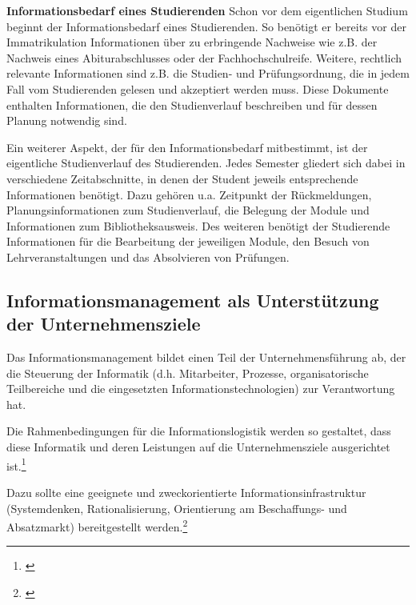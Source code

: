 \textbf{Informationsbedarf eines Studierenden}
Schon vor dem eigentlichen Studium beginnt der Informationsbedarf  eines Studierenden. So benötigt er bereits vor der Immatrikulation Informationen über zu erbringende Nachweise wie z.B. der Nachweis eines Abiturabschlusses oder der Fachhochschulreife. Weitere, rechtlich relevante Informationen sind z.B. die Studien- und Prüfungsordnung, die in jedem Fall vom Studierenden gelesen und akzeptiert werden muss. Diese Dokumente enthalten Informationen, die den Studienverlauf beschreiben und für dessen Planung notwendig sind.

Ein weiterer Aspekt, der für den Informationsbedarf mitbestimmt, ist der eigentliche Studienverlauf des Studierenden. Jedes Semester gliedert sich dabei in verschiedene Zeitabschnitte, in denen der Student jeweils entsprechende Informationen benötigt. Dazu gehören u.a. Zeitpunkt der Rückmeldungen, Planungsinformationen zum Studienverlauf, die Belegung der Module und Informationen zum Bibliotheksausweis. Des weiteren benötigt der Studierende Informationen für die Bearbeitung der jeweiligen Module, den Besuch von Lehrveranstaltungen und das Absolvieren von Prüfungen. 

\subsection{Informationsmanagement als Unterstützung der Unternehmensziele}
Das Informationsmanagement bildet einen Teil der Unternehmensführung ab, der die Steuerung der Informatik (d.h. Mitarbeiter, Prozesse, organisatorische Teilbereiche und die eingesetzten Informationstechnologien) zur Verantwortung hat.

Die Rahmenbedingungen für die Informationslogistik werden so gestaltet, dass diese Informatik und deren Leistungen auf die Unternehmensziele ausgerichtet ist.\footnote{\cite{voss_informationsmanagement_2001}}

Dazu sollte eine geeignete und zweckorientierte Informationsinfrastruktur (Systemdenken, Rationalisierung, Orientierung am Beschaffungs- und Absatzmarkt) bereitgestellt werden.\footnote{\cite{Vgl. u.a. Vieweger, Bernd; Informationsmanagement; 2013}}

